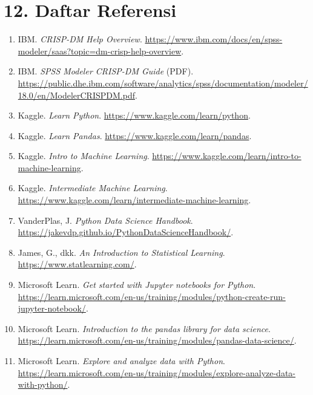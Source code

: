\documentclass[12pt,a4paper]{article}
\begin{document}
\section*{12. Daftar Referensi}

\begin{enumerate}[leftmargin=*]
  \item IBM. \textit{CRISP-DM Help Overview}. \url{https://www.ibm.com/docs/en/spss-modeler/saas?topic=dm-crisp-help-overview}.

  \item IBM. \textit{SPSS Modeler CRISP-DM Guide} (PDF). \url{https://public.dhe.ibm.com/software/analytics/spss/documentation/modeler/18.0/en/ModelerCRISPDM.pdf}.

  \item Kaggle. \textit{Learn Python}. \url{https://www.kaggle.com/learn/python}.

  \item Kaggle. \textit{Learn Pandas}. \url{https://www.kaggle.com/learn/pandas}.

  \item Kaggle. \textit{Intro to Machine Learning}. \url{https://www.kaggle.com/learn/intro-to-machine-learning}.

  \item Kaggle. \textit{Intermediate Machine Learning}. \url{https://www.kaggle.com/learn/intermediate-machine-learning}.

  \item VanderPlas, J. \textit{Python Data Science Handbook}. \url{https://jakevdp.github.io/PythonDataScienceHandbook/}.

  \item James, G., dkk. \textit{An Introduction to Statistical Learning}. \url{https://www.statlearning.com/}.

  \item Microsoft Learn. \textit{Get started with Jupyter notebooks for Python}. \url{https://learn.microsoft.com/en-us/training/modules/python-create-run-jupyter-notebook/}.

  \item Microsoft Learn. \textit{Introduction to the pandas library for data science}. \url{https://learn.microsoft.com/en-us/training/modules/pandas-data-science/}.

  \item Microsoft Learn. \textit{Explore and analyze data with Python}. \url{https://learn.microsoft.com/en-us/training/modules/explore-analyze-data-with-python/}.


\end{enumerate}
\end{document}
